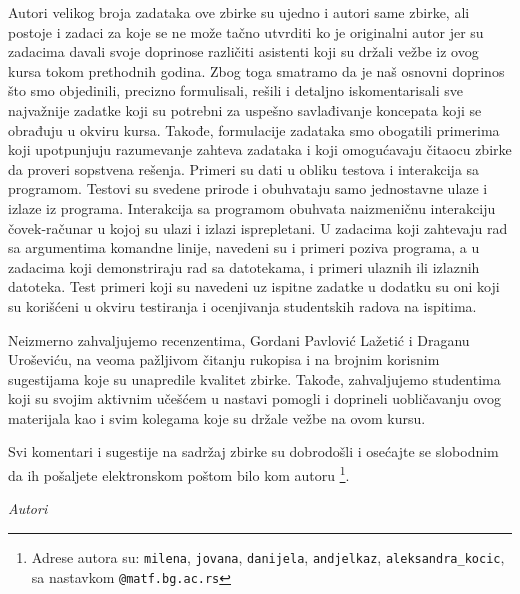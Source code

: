 Autori velikog broja zadataka ove zbirke su ujedno i autori same zbirke, ali postoje 
i zadaci za koje se ne može tačno utvrditi ko je originalni autor jer su zadacima 
davali svoje doprinose različiti asistenti koji su držali vežbe iz ovog kursa 
tokom prethodnih godina. Zbog toga smatramo da je naš osnovni doprinos 
što smo objedinili, precizno formulisali, rešili i detaljno iskomentarisali 
sve najvažnije zadatke koji su potrebni za uspešno savlađivanje koncepata 
koji se obrađuju u okviru kursa. Takođe, formulacije zadataka smo obogatili
primerima koji upotpunjuju razumevanje zahteva zadataka i koji omogućavaju
čitaocu zbirke da proveri sopstvena rešenja. Primeri su dati u obliku 
testova i interakcija sa programom. Testovi su svedene prirode i obuhvataju 
samo jednostavne ulaze i izlaze iz programa. Interakcija sa programom obuhvata 
naizmeničnu interakciju čovek-računar u kojoj su ulazi i izlazi isprepletani. 
U zadacima koji zahtevaju rad sa argumentima komandne linije, navedeni su i primeri poziva programa, a u zadacima koji demonstriraju rad sa datotekama, i primeri ulaznih ili izlaznih datoteka. Test primeri koji su navedeni uz ispitne zadatke u dodatku su oni koji su korišćeni u okviru testiranja i ocenjivanja studentskih radova na ispitima.

Neizmerno zahvaljujemo recenzentima, Gordani Pavlović Lažetić i Draganu Uroševiću, na veoma pažljivom čitanju rukopisa i na brojnim korisnim sugestijama koje su unapredile kvalitet zbirke. Takođe, zahvaljujemo studentima koji su svojim aktivnim učešćem u nastavi pomogli i doprineli uobličavanju ovog materijala kao i svim kolegama koje su držale vežbe na ovom kursu. 

Svi komentari i sugestije na sadržaj zbirke su dobrodošli i osećajte se slobodnim da ih pošaljete elektronskom poštom bilo kom autoru \footnote{Adrese autora su: \texttt{milena}, \texttt{jovana}, \texttt{danijela}, \texttt{andjelkaz}, \texttt{aleksandra\_kocic}, sa nastavkom \texttt{@matf.bg.ac.rs}}. 


\bigskip


\bigskip

\begin{flushright}
{\em Autori}
\end{flushright}

